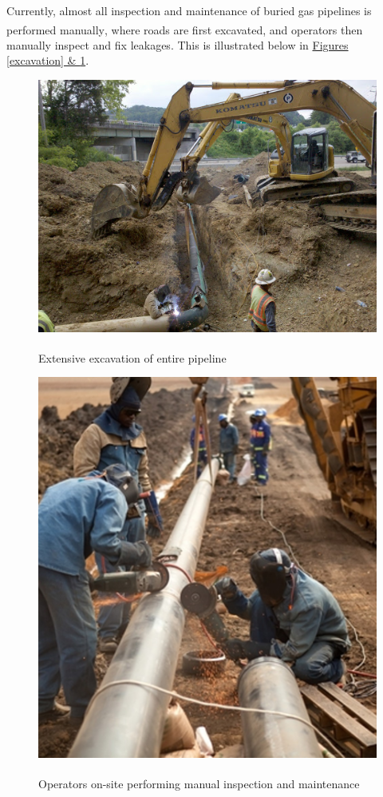 \documentclass[11pt]{article}		%
\newlength{\imageheight}	 %
\newcommand{\supercite}[1]{\textsuperscript{\cite{#1}}}		%
\begin{document}
		Currently, almost all inspection and maintenance of buried gas pipelines is performed manually\supercite{manually}, where roads are first excavated, and operators then manually inspect and fix leakages. This is illustrated below in \hyperref[excavation]{Figures \ref*{excavation} \& \ref*{pipelineRepair}}.

		\begin{figure}[h]
					\centering
					\begin{multicols}{2}
						\includegraphics[height=\imageheight]{Pipeline Excavation.jpg}
						\caption{Extensive excavation of entire pipeline\supercite{excavationpipeline}}
						\label{excavation}
						\columnbreak
						\includegraphics[height=\imageheight]{Pipeline Repair.jpg}
						\caption{Operators on-site performing manual inspection and maintenance\supercite{manualinspection}}
						\label{pipelineRepair}
					\end{multicols}
				\end{figure}
\end{document}

